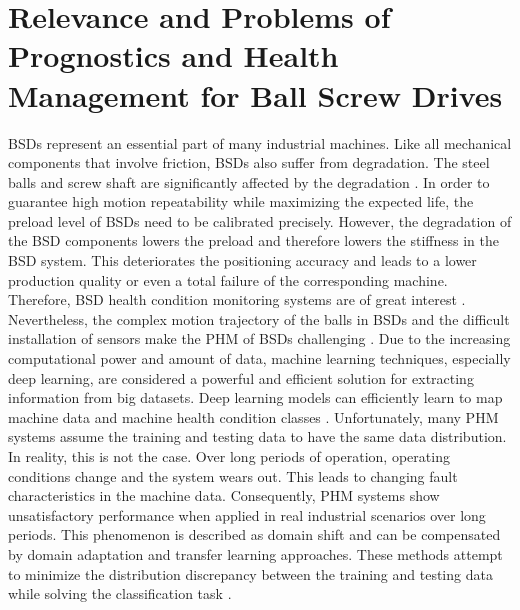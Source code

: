 \section{Relevance and Problems of Prognostics and Health Management for Ball Screw Drives}
BSDs represent an essential part of many industrial machines. Like all mechanical components that involve friction, BSDs also suffer from degradation. The steel balls and screw shaft are significantly affected by the degradation \cite{Pandhare2021}. In order to guarantee high motion repeatability while maximizing the expected life, the preload level of BSDs need to be calibrated precisely. However, the degradation of the BSD components lowers the preload and therefore lowers the stiffness in the BSD system. This deteriorates the positioning accuracy and leads to a lower production quality or even a total failure of the corresponding machine. Therefore, BSD health condition monitoring systems are of great interest \cite{Pandhare2021}. Nevertheless, the complex motion trajectory of the balls in BSDs and the difficult installation of sensors make the PHM of BSDs challenging \cite{LiPin2018}. Due to the increasing computational power and amount of data, machine learning techniques, especially deep learning, are considered a powerful and efficient solution for extracting information from big datasets. Deep learning models can efficiently learn to map machine data and machine health condition classes \cite{ZHAO2019213}. Unfortunately, many PHM systems assume the training and testing data to have the same data distribution. In reality, this is not the case. Over long periods of operation, operating conditions change and the system wears out. This leads to changing fault characteristics in the machine data. Consequently, PHM systems show unsatisfactory performance when applied in real industrial scenarios over long periods. This phenomenon is described as domain shift and can be compensated by domain adaptation and transfer learning approaches. These methods attempt to minimize the distribution discrepancy between the training and testing data while solving the classification task \cite{AZAMFAR2020103932}.


